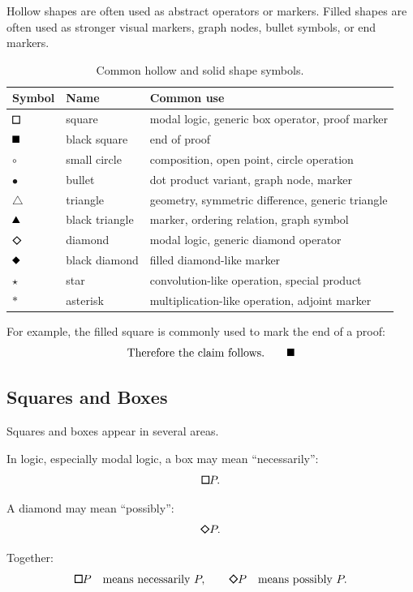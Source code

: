 \documentclass[11pt,twocolumn]{article}
\newcommand{\safesquare}{%
  \mathord{\vcenter{\hbox{\tikz[baseline=-0.5ex]\draw[line width=0.08em] (0,0) rectangle (0.62em,0.62em);}}}%
}
\newcommand{\safeblacksquare}{%
  \mathord{\vcenter{\hbox{\tikz[baseline=-0.5ex]\fill (0,0) rectangle (0.62em,0.62em);}}}%
}
\newcommand{\safeblacktriangle}{%
  \mathord{\vcenter{\hbox{\tikz[baseline=-0.5ex]\fill (0,0) -- (0.68em,0) -- (0.34em,0.62em) -- cycle;}}}%
}
\newcommand{\safediamond}{%
  \mathord{\vcenter{\hbox{\tikz[baseline=-0.5ex]\draw[line width=0.08em] (0.34em,0) -- (0.68em,0.34em) -- (0.34em,0.68em) -- (0,0.34em) -- cycle;}}}%
}
\newcommand{\safeblackdiamond}{%
  \mathord{\vcenter{\hbox{\tikz[baseline=-0.5ex]\fill (0.34em,0) -- (0.68em,0.34em) -- (0.34em,0.68em) -- (0,0.34em) -- cycle;}}}%
}
\begin{document}
Hollow shapes are often used as abstract operators or markers. Filled shapes
are often used as stronger visual markers, graph nodes, bullet symbols, or end
markers.

\begin{table}[ht]
\centering
\small
\caption{Common hollow and solid shape symbols.}
\begin{tabular}{lll}
\toprule
Symbol & Name & Common use \\
\midrule
$\safesquare$ & square & modal logic, generic box operator, proof marker \\
$\safeblacksquare$ & black square & end of proof \\
$\circ$ & small circle & composition, open point, circle operation \\
$\bullet$ & bullet & dot product variant, graph node, marker \\
$\triangle$ & triangle & geometry, symmetric difference, generic triangle \\
$\safeblacktriangle$ & black triangle & marker, ordering relation, graph symbol \\
$\safediamond$ & diamond & modal logic, generic diamond operator \\
$\safeblackdiamond$ & black diamond & filled diamond-like marker \\
$\star$ & star & convolution-like operation, special product \\
$\ast$ & asterisk & multiplication-like operation, adjoint marker \\
\bottomrule
\end{tabular}
\end{table}

For example, the filled square is commonly used to mark the end of a proof:
\[
\text{Therefore the claim follows.}
\qquad
\safeblacksquare
\]

\subsection{Squares and Boxes}

Squares and boxes appear in several areas.

In logic, especially modal logic, a box may mean ``necessarily'':
\[
\safesquare P.
\]

A diamond may mean ``possibly'':
\[
\safediamond P.
\]

Together:
\[
\safesquare P
\quad
\text{means necessarily } P,
\qquad
\safediamond P
\quad
\text{means possibly } P.
\]
\end{document}
